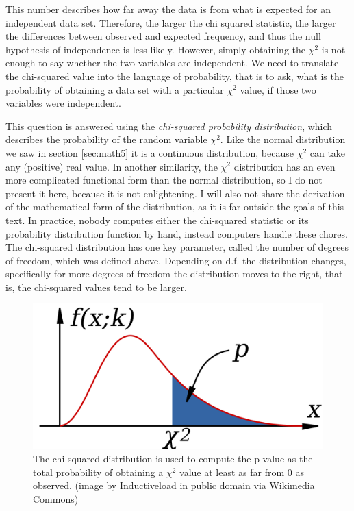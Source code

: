 \documentclass[
  letterpaper,
  DIV=11,
  numbers=noendperiod]{scrreprt}
\begin{document}
This number describes how far away the data is from what is expected for
an independent data set. Therefore, the larger the chi squared
statistic, the larger the differences between observed and expected
frequency, and thus the null hypothesis of independence is less likely.
However, simply obtaining the \(\chi^2\) is not enough to say whether
the two variables are independent. We need to translate the chi-squared
value into the language of probability, that is to ask, what is the
probability of obtaining a data set with a particular \(\chi^2\) value,
if those two variables were independent.

This question is answered using the \emph{chi-squared probability
distribution}, which describes the probability of the random variable
\(\chi^2\). Like the normal distribution we saw in section
\ref{sec:math5} it is a continuous distribution, because \(\chi^2\) can
take any (positive) real value. In another similarity, the \(\chi^2\)
distribution has an even more complicated functional form than the
normal distribution, so I do not present it here, because it is not
enlightening. I will also not share the derivation of the mathematical
form of the distribution, as it is far outside the goals of this text.
In practice, nobody computes either the chi-squared statistic or its
probability distribution function by hand, instead computers handle
these chores. The chi-squared distribution has one key parameter, called
the number of degrees of freedom, which was defined above. Depending on
d.f. the distribution changes, specifically for more degrees of freedom
the distribution moves to the right, that is, the chi-squared values
tend to be larger.

\begin{figure}

{\centering \includegraphics{./ch6/Chi-Squared_Distribution.png}

}

\caption{The chi-squared distribution is used to compute the p-value as
the total probability of obtaining a \(\chi^2\) value at least as far
from 0 as observed. (image by Inductiveload in public domain via
Wikimedia Commons)}

\end{figure}
\end{document}

